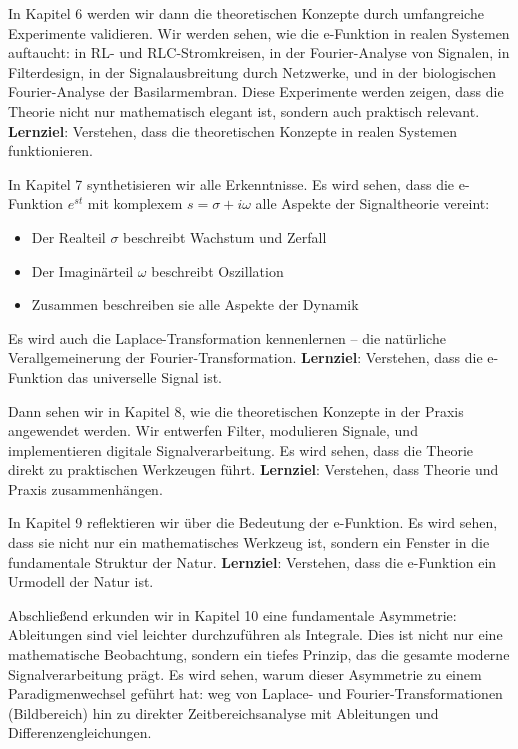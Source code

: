 ﻿\documentclass[a4paper,12pt]{report}
\theoremstyle{definition}
\begin{document}
	In Kapitel 6 werden wir dann die theoretischen Konzepte durch umfangreiche Experimente validieren. Wir werden sehen, wie die e-Funktion in realen Systemen auftaucht: in RL- und RLC-Stromkreisen, in der Fourier-Analyse von Signalen, in Filterdesign, in der Signalausbreitung durch Netzwerke, und in der biologischen Fourier-Analyse der Basilarmembran. Diese Experimente werden zeigen, dass die Theorie nicht nur mathematisch elegant ist, sondern auch praktisch relevant. \textbf{Lernziel}: Verstehen, dass die theoretischen Konzepte in realen Systemen funktionieren.
	
	In Kapitel 7 synthetisieren wir alle Erkenntnisse. Es wird sehen, dass die e-Funktion $e^{st}$ mit komplexem $s = \sigma + i\omega$ alle Aspekte der Signaltheorie vereint:
	\begin{itemize}
		\item[-] Der Realteil $\sigma$ beschreibt Wachstum und Zerfall
		\item[-] Der Imaginärteil $\omega$ beschreibt Oszillation
		\item[-] Zusammen beschreiben sie alle Aspekte der Dynamik
	\end{itemize}
	
	Es wird auch die Laplace-Transformation kennenlernen -- die natürliche Verallgemeinerung der Fourier-Transformation. \textbf{Lernziel}: Verstehen, dass die e-Funktion das universelle Signal ist.
	
	Dann sehen wir in Kapitel 8, wie die theoretischen Konzepte in der Praxis angewendet werden. Wir entwerfen Filter, modulieren Signale, und implementieren digitale Signalverarbeitung. Es wird sehen, dass die Theorie direkt zu praktischen Werkzeugen führt. \textbf{Lernziel}: Verstehen, dass Theorie und Praxis zusammenhängen.
	
	In Kapitel 9 reflektieren wir über die Bedeutung der e-Funktion. Es wird sehen, dass sie nicht nur ein mathematisches Werkzeug ist, sondern ein Fenster in die fundamentale Struktur der Natur. \textbf{Lernziel}: Verstehen, dass die e-Funktion ein Urmodell der Natur ist.
	
	Abschließend erkunden wir in Kapitel 10 eine fundamentale Asymmetrie: Ableitungen sind viel leichter durchzuführen als Integrale. Dies ist nicht nur eine mathematische Beobachtung, sondern ein tiefes Prinzip, das die gesamte moderne Signalverarbeitung prägt. Es wird sehen, warum dieser Asymmetrie zu einem Paradigmenwechsel geführt hat: weg von Laplace- und Fourier-Transformationen (Bildbereich) hin zu direkter Zeitbereichsanalyse mit Ableitungen und Differenzengleichungen.
	
\end{document}
